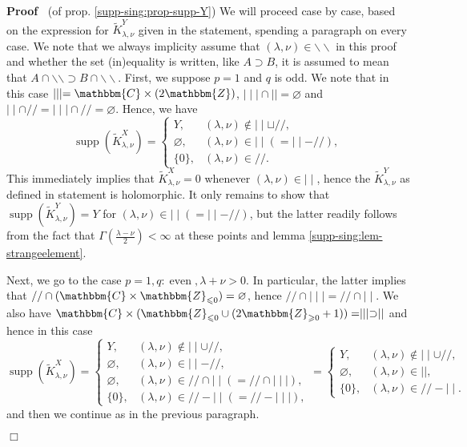 \documentclass{article}
\newcommand{\nin}{\not\in}
\newcommand{\tmop}[1]{\ensuremath{\operatorname{#1}}}
\renewenvironment{proof}{\noindent\textbf{Proof\ }}{\hspace*{\fill}$\Box$\medskip}
\theoremstyle{remark}
\begin{document}
\begin{proof}
  (of prop. \ref{supp-sing:prop-supp-Y}) We will proceed case by case, based
  on the expression for $\tilde{K}_{\lambda, \nu}^Y$ given in the statement,
  spending a paragraph on every case. We note that we always implicity assume
  that $(\lambda, \nu) \in \backslash\backslash$ in this proof and whether the
  set (in)equality is written, like $A \supset B$, it is assumed to mean that
  $A \cap \backslash\backslash \supset B \cap \backslash\backslash$. First, we
  suppose $p = 1$ and $q$ is odd. We note that in this case $\mid \mid \mid
  =\mathbbm{C} \times (2\mathbbm{Z})$, $\mid \mid \mid \cap \mid \mid =
  \varnothing$ and $\mid \mid \cap / / = \mid \mid \mid \cap / / =
  \varnothing$. Hence, we have
  \[ \tmop{supp} (\tilde{K}_{\lambda, \nu}^X) = \left\{ \begin{array}{ll}
       Y, & (\lambda, \nu) \nin \mid \mid \sqcup / /,\\
       \varnothing, & (\lambda, \nu) \in \mid \mid (= \mid \mid - / /),\\
       \{ 0 \}, & (\lambda, \nu) \in / / .
     \end{array} \right. \]
  This immediately implies that $\tilde{K}_{\lambda, \nu}^X = 0$ whenever
  $(\lambda, \nu) \in \mid \mid$, hence the $\tilde{K}_{\lambda, \nu}^Y$ as
  defined in statement is holomorphic. It only remains to show that
  $\tmop{supp} (\tilde{K}_{\lambda, \nu}^Y) = Y$ for $(\lambda, \nu) \in \mid
  \mid (= \mid \mid - / /)$, but the latter readily follows from the fact that
  $\Gamma \left( \frac{\lambda - \nu}{2} \right) < \infty$ at these points and
  lemma \ref{supp-sing:lem-strangeelement}.
  
  Next, we go to the case $p = 1, q : \tmop{even}, \lambda + \nu > 0$. In
  particular, the latter implies that $/ / \cap (\mathbbm{C} \times
  \mathbbm{Z}_{\leqslant 0}) = \varnothing$, hence $/ / \cap \mid \mid \mid =
  / / \cap \mid \mid$. We also have $\mathbbm{C} \times
  (\mathbbm{Z}_{\leqslant 0} \cup (2\mathbbm{Z}_{\geqslant 0} + 1)) = \mid
  \mid \mid \supset \mid \mid$ and hence in this case
  \[ \tmop{supp} (\tilde{K}_{\lambda, \nu}^X) = \left\{ \begin{array}{ll}
       Y, & (\lambda, \nu) \nin \mid \mid \cup / /,\\
       \varnothing, & (\lambda, \nu) \in \mid \mid - / /,\\
       \varnothing, & (\lambda, \nu) \in / / \cap \mid \mid (= / / \cap \mid
       \mid \mid),\\
       \{ 0 \}, & (\lambda, \nu) \in / / - \mid \mid (= / / - \mid \mid \mid),
     \end{array} \right. = \left\{ \begin{array}{ll}
       Y, & (\lambda, \nu) \nin \mid \mid \cup / /,\\
       \varnothing, & (\lambda, \nu) \in \mid \mid,\\
       \{ 0 \}, & (\lambda, \nu) \in / / - \mid \mid .
     \end{array} \right. \]
  and then we continue as in the previous paragraph.
  

\end{proof}
\end{document}
